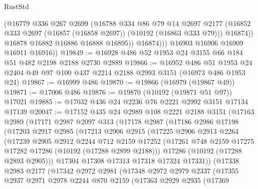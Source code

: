 \begin{lexlean}{RustStd}
\begin{coremodule}
                  (@16779
                    @336
                    @267
                    @2699
                    (@16788
                      @334
                      @86
                      @79
                      @14
                      @2697
                      @2177
                      (@16852 @333 @2697 (@16857 (@16858 @2697)) (@10192 (@16863 @333 @79)))
                      @16874))
                  @16878
                  @16882
                  @16886
                  @16888
                  @16895))
              @16874)))
        @16903
        @16906
        @16909
        @16911
        @16916))
@19849 := @16928 @486 @52 @1953 @24 @3155 @66 @184 @51 @482 @2198 @2188 @2730 @2889
@19866 := @16952
    @486
    @51
    @1953
    @24
    @2404
    @49
    @97
    @100
    @437
    @2214
    @2188
    @2993
    @3151
    (@16973 @486 @1953 @24)
@19867 := @16999 @486
@19870 := @19866 (@16979 (@19867 @49))
@19871 := @17006 @486
@19876 := @19870 (@10192 (@19871 @51 @97)) @17021
@19885 := @17032 @436 @24 @2236 @76 @2221 @2992 @3151 @17134 @17139
@20047 := @17152
    @435
    @24
    @2989
    @108
    @2221
    @2188
    @3151
    (@17163
      @2989
      (@17171
        @2987
        @2097
        @313
        (@17178
          @2987
          (@17186
            @2986
            @17198
            (@17203
              @2917
              @2985
              (@17213
                @2906
                @2915
                (@17225
                  @2906
                  @2913
                  @2264
                  (@17239
                    @2905
                    @2912
                    @2244
                    @712
                    @2159
                    @17252
                    (@17261 @748 @2159 @17275 @17282 @17286 (@10192 (@17288 @2899 @2188)))
                    @17286
                    (@10192 (@17288 @2893 @2905)))
                  @17304
                  @17308
                  @17313
                  @17318
                  @17324
                  @17331))
              (@17338
                @2983
                @2177
                (@17342
                  @2972
                  @2981
                  (@17348
                    @2972
                    @2979
                    @2337
                    (@17355
                      @2937
                      @2971
                      @2978
                      @2244
                      @870
                      @2159
                      (@17363
                        @2929
                        @2935
                        (@17369

\end{coremodule}
\end{lexlean}
